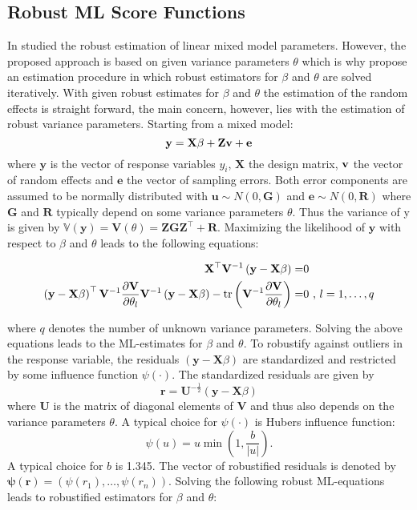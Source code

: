 \subsection{Robust ML Score Functions}\label{robust-ml-score-functions}

In \textcite{Fel86} studied the robust estimation of linear mixed model
parameters. However, the proposed approach is based on given variance
parameters $\theta$ which is why \textcite{Sin09} propose an estimation
procedure in which robust estimators for $\beta$ and $\theta$ are solved
iteratively. With given robust estimates for $\beta$ and $\theta$ the
estimation of the random effects is straight forward, the main concern,
however, lies with the estimation of robust variance parameters.
Starting from a mixed model: \[
\mathbf{y} = \mathbf{X} \beta + \mathbf{Z} \mathbf{v} + \mathbf{e}
\] where $\mathbf{y}$ is the vector of response variables $y_i$,
$\mathbf{X}$ the design matrix, $\mathbf{v}$ the vector of random
effects and $\mathbf{e}$ the vector of sampling errors. Both error
components are assumed to be normally distributed with
$\mathbf{u} \sim \mathit{N}(0, \mathbf{G})$ and
$\mathbf{e} \sim \mathit{N}(0, \mathbf{R})$ where $\mathbf{G}$ and
$\mathbf{R}$ typically depend on some variance parameters $\theta$. Thus
the variance of y is given by
$\mathbb{V}(\mathbf{y}) = \mathbf{V}(\theta) = \mathbf{Z}\mathbf{G}\mathbf{Z}^\top + \mathbf{R}$.
Maximizing the likelihood of $\mathbf{y}$ with respect to $\beta$ and
$\theta$ leads to the following equations:

\begin{align*}
\mathbf{X}^\top\mathbf{V}^{-1}\left(\mathbf{y}-\mathbf{X}\beta\right) =& 0 \\
\left(\mathbf{y}-\mathbf{X}\beta\right)^\top\mathbf{V}^{-1}\frac{\partial\mathbf{V}}{\partial\theta_l}\mathbf{V}^{-1}\left(\mathbf{y}-\mathbf{X}\beta\right) - \operatorname{tr}\left(\mathbf{V}^{-1}\frac{\partial\mathbf{V}}{\partial\theta_l}\right) =& 0 \text{ , } l = 1, \dots, q
\end{align*}

where $q$ denotes the number of unknown variance parameters. Solving the
above equations leads to the ML-estimates for $\beta$ and $\theta$. To
robustify against outliers in the response variable, the residuals
$\left(\mathbf{y}-\mathbf{X}\beta\right)$ are standardized and
restricted by some influence function $\psi(\cdot)$. The standardized
residuals are given by \[
\mathbf{r} = \mathbf{U}^{-\frac{1}{2}}
\left(\mathbf{y}-\mathbf{X}\beta\right)
\] where $\mathbf{U}$ is the matrix of diagonal elements of $\mathbf{V}$
and thus also depends on the variance parameters $\theta$. A typical
choice for $\psi(\cdot)$ is Hubers influence function: \[
\psi(u) = u \min\left(1, \frac{b}{|u|}\right).
\] A typical choice for $b$ is 1.345. The vector of robustified
residuals is denoted by
$\mathbf{\psi}(\mathbf{r}) = (\psi(r_1), \dots, \psi(r_{n}))$. Solving
the following robust ML-equations leads to robustified estimators for
$\beta$ and $\theta$:

